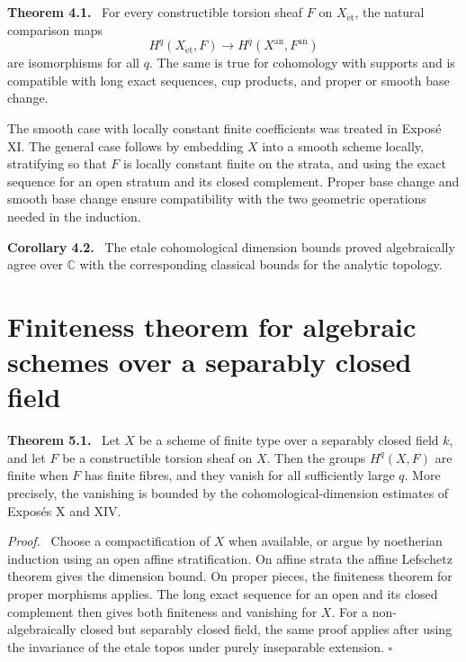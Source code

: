 \documentclass[12pt]{article}
\newcommand{\Cc}{\mathbb{C}}
\newcommand{\an}{\mathrm{an}}
\newcommand{\et}{\mathrm{\acute{e}t}}
\newcommand{\qedtext}{\hfill\(\square\)}
\newenvironment{statement}[1]{\par\medskip\noindent\textbf{#1.}\ }{\par\medskip}
\newenvironment{prooftext}[1][Proof]{\par\noindent\emph{#1.}\ }{\par\medskip}
\begin{document}
\begin{statement}{Theorem 4.1}
For every constructible torsion sheaf \(F\) on \(X_{\et}\), the natural comparison maps
\[
H^q(X_{\et},F)\longrightarrow H^q(X^{\an},F^{\an})
\]
are isomorphisms for all \(q\). The same is true for cohomology with supports and is compatible with long exact sequences, cup products, and proper or smooth base change.
\end{statement}

The smooth case with locally constant finite coefficients was treated in Expos\'e XI. The general case follows by embedding \(X\) into a smooth scheme locally, stratifying so that \(F\) is locally constant finite on the strata, and using the exact sequence for an open stratum and its closed complement. Proper base change and smooth base change ensure compatibility with the two geometric operations needed in the induction.

\begin{statement}{Corollary 4.2}
The etale cohomological dimension bounds proved algebraically agree over \(\Cc\) with the corresponding classical bounds for the analytic topology.
\end{statement}

\section{Finiteness theorem for algebraic schemes over a separably closed field}

\begin{statement}{Theorem 5.1}
Let \(X\) be a scheme of finite type over a separably closed field \(k\), and let \(F\) be a constructible torsion sheaf on \(X\). Then the groups \(H^q(X,F)\) are finite when \(F\) has finite fibres, and they vanish for all sufficiently large \(q\). More precisely, the vanishing is bounded by the cohomological-dimension estimates of Expos\'es X and XIV.
\end{statement}

\begin{prooftext}
Choose a compactification of \(X\) when available, or argue by noetherian induction using an open affine stratification. On affine strata the affine Lefschetz theorem gives the dimension bound. On proper pieces, the finiteness theorem for proper morphisms applies. The long exact sequence for an open and its closed complement then gives both finiteness and vanishing for \(X\). For a non-algebraically closed but separably closed field, the same proof applies after using the invariance of the etale topos under purely inseparable extension. \qedtext
\end{prooftext}
\end{document}
